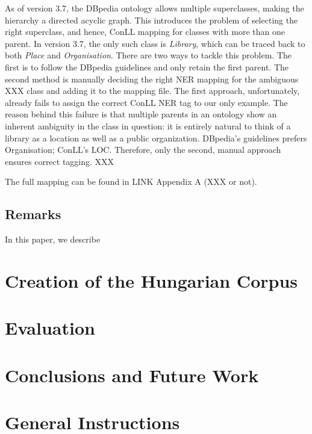 \documentclass[11pt]{article}
\begin{document}
As of version 3.7, the DBpedia ontology allows multiple superclasses, making the hierarchy a directed acyclic graph. This introduces the problem of selecting the right superclass, and hence, ConLL mapping for classes with more than one parent. In version 3.7, the only such class is \textit{Library}, which can be traced back to both \textit{Place} and \textit{Organisation}. There are two ways to tackle this problem. The first is to follow the DBpedia guidelines and only retain the first parent. The second method is manually deciding the right NER mapping for the ambiguous XXX class and adding it to the mapping file. The first approach, unfortunately, already fails to assign the correct ConLL NER tag to our only example. The reason behind this failure is that multiple parents in an ontology show an inherent ambiguity in the class in question: it is entirely natural to think of a library as a location as well as a public organization. DBpedia's guidelines prefers Organisation; ConLL's LOC. Therefore, only the second, manual approach ensures correct tagging. XXX

The full mapping can be found in LINK Appendix A (XXX or not).

\subsection{Remarks}


In this paper, we describe %

\section{Creation of the Hungarian Corpus}


\section{Evaluation}


\section{Conclusions and Future Work}

\section{General Instructions}
\end{document}
